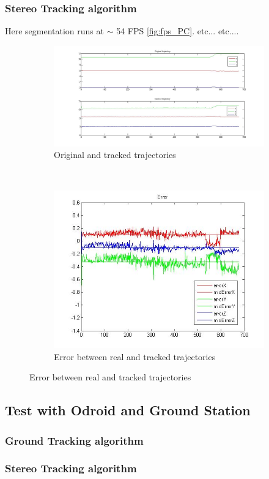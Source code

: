		
	\subsubsection{Stereo Tracking algorithm}
	Here segmentation runs at $\sim$ 54 FPS  \ref{fig:fps_PC}. etc... etc....
	
	\begin{figure}[ht]
		\centering
		\begin{subfigure}[ht]{0.45\linewidth}
			\centering
				\includegraphics[width=\linewidth]{../Images/c4/trajs_stereo}
				\caption{Original and tracked trajectories}
				\label{fig:trajectories_stereo_PC}
		\end{subfigure}
		~
		\begin{subfigure}[ht]{0.45\linewidth}
			\centering
			\includegraphics[width=\linewidth]{../Images/c4/errors_stereo}
			\caption{Error between real and tracked trajectories}
			\label{fig:errors_stereo_PC}
		\end{subfigure}	
	\end{figure}

	
\subsection{Test with Odroid and Ground Station}

	\subsubsection{Ground Tracking algorithm}
	
	\subsubsection{Stereo Tracking algorithm}